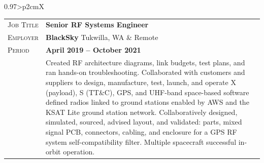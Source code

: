 \documentclass[a4paper, oneside, final]{scrartcl}
\newcommand{\gray}{\rowcolor[gray]{.90}} %
\begin{document}
\begin{center}
\begin{tabularx}{0.97\linewidth}{>{\raggedleft\scshape}p{2cm}X}
\end{tabularx}

\begin{tabularx}{0.97\linewidth}{>{\raggedleft\scshape}p{2cm}X}
\gray Job Title & \textbf{Senior RF Systems Engineer}\\
\gray Employer & \textbf{BlackSky} \hfill Tukwilla, WA \& Remote\\
\gray Period & \textbf{April 2019 -- October 2021}\\
&
\vspace{-0.15 cm}
Created RF architecture diagrams, link budgets, test plans, and ran hands-on troubleshooting. Collaborated with customers and suppliers to design, manufacture, test, launch, and operate X (payload), S (TT\&C), GPS, and UHF-band space-based software defined radios linked to ground stations enabled by AWS and the KSAT Lite ground station network.
\newline
\newline
Collaboratively designed, simulated, sourced, advised layout, and validated: parts, mixed signal PCB, connectors, cabling, and enclosure for a GPS RF system self-compatibility filter.  Multiple spacecraft successful in-orbit operation.
\newline
\end{tabularx}


\end{center}
\end{document}
